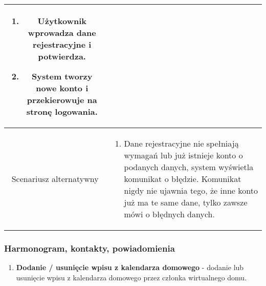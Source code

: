 \documentclass{article}
\begin{document}
\begin{enumerate}
\begin{enumerate}
\begin{table}[H]
\begin{tabular}{|c|p{7cm}|}
\begin{enumerate}
\item Użytkownik wprowadza dane rejestracyjne i potwierdza.

\item System tworzy nowe konto i przekierowuje na stronę logowania.\end{enumerate}                                                           \\
						\hline
						Scenariusz alternatywny & \begin{enumerate}\item Dane rejestracyjne nie spełniają wymagań lub już istnieje konto o podanych danych, system wyświetla komunikat o błędzie. Komunikat nigdy nie ujawnia tego, że inne konto już ma te same dane, tylko zawsze mówi o błędnych danych.\end{enumerate} \\
						\hline
					\end{tabular}
				\end{table}
		\end{enumerate}

		\subsubsection{Harmonogram, kontakty, powiadomienia}
		\begin{enumerate}
			\item \textbf{Dodanie / usunięcie wpisu z kalendarza domowego} - dodanie
				lub usunięcie wpisu z kalendarza domowego przez członka wirtualnego domu.


\end{enumerate}
\end{enumerate}
\end{document}
